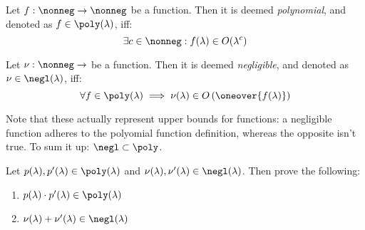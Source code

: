 \begin{definition}
    Let $f : \nonneg \to \nonneg$ be a function. Then it is deemed \emph{polynomial}, and denoted as $f \in \poly(\lambda)$, iff:
    \[
        \exists c \in \nonneg : f(\lambda) \in O(\lambda^c)
    \]
\end{definition}

\begin{definition}
    Let $\nu : \nonneg \to \real$ be a function. Then it is deemed \emph{negligible}, and denoted as $\nu \in \negl(\lambda)$, iff:
    \[
        \forall f \in \poly(\lambda)  \implies \nu(\lambda) \in O\left(\oneover{f(\lambda)}\right)
    \]
\end{definition}

Note that these actually represent upper bounds for functions: a negligible function adheres to the polyomial function definition, whereas the opposite isn't true. To sum it up: $\negl \subset \poly$.

\begin{exercise}
    Let $p(\lambda), p'(\lambda) \in \poly(\lambda)$ and $\nu(\lambda), \nu'(\lambda) \in \negl(\lambda)$. Then prove the following:

    \begin{enumerate}
        \item $p(\lambda) \cdot p'( \lambda) \in  \poly(\lambda)$
        \item \label{ex:negl} $\nu(\lambda) + \nu'(\lambda) \in \negl(\lambda)$
    \end{enumerate} 
\end{exercise}

